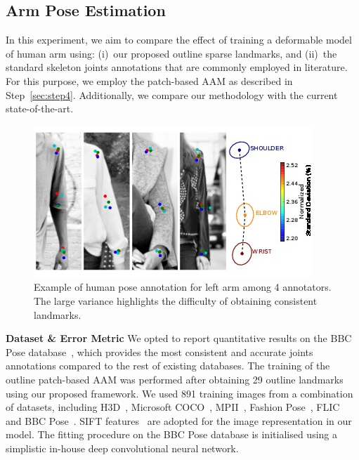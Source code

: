 \subsection{Arm Pose Estimation}
\label{exp:benchmark_arm}
In this experiment, we aim to compare the effect of training a deformable model of human arm using: (i)~our proposed outline sparse landmarks, and (ii)~the standard skeleton joints annotations that are commonly employed in literature. For this purpose, we employ the patch-based AAM as described in Step~\ref{sec:step4}. Additionally, we compare our methodology with the current state-of-the-art.

\begin{figure}
    \centering
    \includegraphics[width=\columnwidth]{resources/Annotation_Correction/Fig_Variance/final}
    \caption{Example of human pose annotation for left arm among 4 annotators. The large variance highlights the difficulty of obtaining consistent landmarks.}
    \label{fig:variance}
\end{figure}

\noindent\textbf{Dataset \& Error Metric} We opted to report quantitative results on the BBC Pose database~\cite{pfister2015flowing}, which provides the most consistent and accurate joints annotations compared to the rest of existing databases. The training of the outline patch-based AAM was performed after obtaining 29 outline landmarks using our proposed framework. We used 891 training images from a combination of datasets, including H3D~\cite{PoseletsICCV09}, Microsoft COCO~\cite{lin2014microsoft}, MPII~\cite{andriluka14cvpr}, Fashion Pose~\cite{dantone2013human}, FLIC~\cite{sapp2013modec} and BBC Pose~\cite{pfister2015flowing}. SIFT features~\cite{PoseletsICCV09} are adopted for the image representation in our model. The fitting procedure on the BBC Pose database is initialised using a simplistic in-house deep convolutional neural network.

